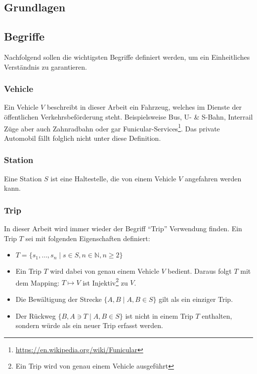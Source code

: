 \begin{newpage}
	
	\section{Grundlagen}
	\label{sec:Grundlagen}

  \subsection{Begriffe}
  \label{sub:begriffe}
    Nachfolgend sollen die wichtigsten Begriffe definiert werden, um ein Einheitliches Verständnis zu garantieren.

    \subsubsection{Vehicle}
    \label{ssub:vehicle}
      Ein Vehicle $V$ beschreibt in dieser Arbeit ein Fahrzeug, welches im Dienste der öffentlichen Verkehrsbeförderung steht. Beispielsweise Bus, U- \& S-Bahn, Interrail Züge aber auch Zahnradbahn oder gar Funicular-Services\footnote{\url{https://en.wikipedia.org/wiki/Funicular}}. Das private Automobil fällt folglich nicht unter diese Definition.

    \subsubsection{Station}
    \label{ssub:station}
      Eine Station $S$ ist eine Haltestelle, die von einem Vehicle $V$ angefahren werden kann.

    \subsubsection{Trip}
    \label{ssub:trip}
      In dieser Arbeit wird immer wieder der Begriff "`Trip"' Verwendung finden. Ein Trip $T$ sei mit folgenden Eigenschaften definiert:
      \begin{itemize}
        \item $T = \{s_1, \dotsc, s_n \;|\; s \in S, n \in \mathbb{N}, n \geq 2 \}$
        \item Ein Trip $T$ wird dabei von genau einem Vehicle $V$ bedient. Daraus folgt $T$ mit dem Mapping: $T \mapsto V$ ist Injektiv\footnote{Ein Trip wird von genau einem Vehicle ausgeführt} zu $V$. 
        \item Die Bewältigung der Strecke $\{A,B \;|\; A, B \in S\}$ gilt als ein einziger Trip.
        \item Der Rückweg $\{B, A \ni T \;|\; A, B \in S\}$ ist nicht in einem Trip $T$ enthalten, sondern würde als ein neuer Trip erfasst werden.
      \end{itemize}
      

\end{newpage}

